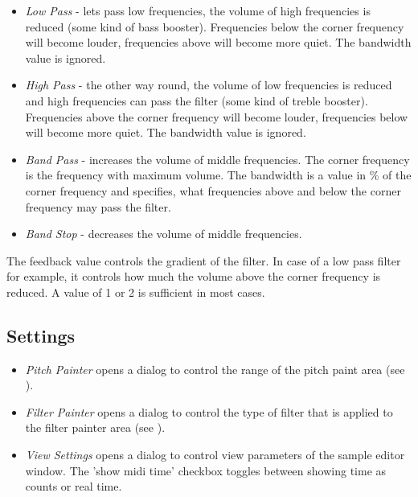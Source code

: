 \documentclass[letterpaper]{report}
\begin{document}
\begin{itemize}
\item {\em Low Pass} - lets pass low frequencies, the volume of high
frequencies is reduced (some kind of bass booster).
Frequencies below the corner frequency will become louder, frequencies above
will become more quiet. The bandwidth value is ignored.

\item {\em High Pass} - the other way round, the volume of low frequencies is
reduced and high frequencies can pass the filter (some kind of treble booster).
Frequencies above the corner frequency will become louder, frequencies below
will become more quiet. The bandwidth value is ignored.

\item {\em Band Pass} - increases the volume of middle frequencies. The corner
frequency is the frequency with maximum volume. The bandwidth is a value
in \% of the corner frequency and specifies, what frequencies above
and below the corner frequency may pass the filter.

\item {\em Band Stop} - decreases the volume of middle frequencies.
\end{itemize}

The feedback value controls the gradient of the filter. In case of a low
pass filter for example, it controls how much the volume above the
corner frequency is reduced. A value of 1 or 2 is sufficient in most
cases.

\subsection{Settings}

\begin{itemize}

\item {\em Pitch Painter} opens a dialog to control the range of the
pitch paint area (see ).

\item {\em Filter Painter} opens a dialog to control the type of filter that
is applied to the filter painter area (see ).

\item {\em View Settings} opens a dialog to control view parameters of the
sample editor window. The 'show midi time' checkbox toggles between
showing time as counts or real time.

\end{itemize}
\end{document}
